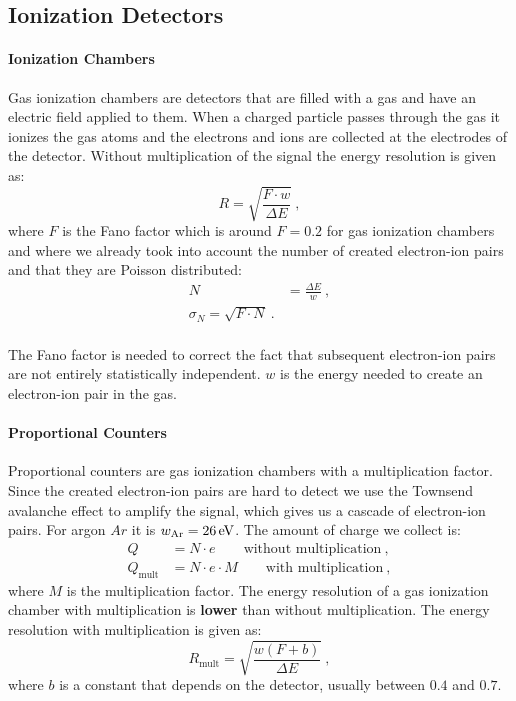 \documentclass[10pt, titlepage, a4paper]{article}
\numberwithin{equation}{section}
\begin{document}
\subsection{Ionization Detectors}
\paragraph{Ionization Chambers}
Gas ionization chambers are detectors that are filled with a gas and have an electric field applied to them. When a charged particle
passes through the gas it ionizes the gas atoms and the electrons and ions are collected at the electrodes of the detector. Without multiplication of the signal 
the energy resolution is given as:
%
\begin{equation}
    R = \sqrt{\frac{F\cdot w}{\Delta E}}\>,
    \label{eq:ionization-res}
\end{equation}
%
where $F$ is the Fano factor which is around $F = 0.2$ for gas ionization chambers and where we already took into account 
the number of created electron-ion pairs and that they are Poisson distributed:
%
\begin{align}
    N &= \frac{\Delta E}{w}\>, \\
    \label{eq:ion-N}
    \sigma_N = \sqrt{F\cdot N}\>. \\
    \label{eq:ion-sigma} 
\end{align}

The Fano factor is needed to correct the fact that subsequent electron-ion pairs are not entirely statistically 
independent. $w$ is the energy needed to create an electron-ion pair in the gas.

\paragraph{Proportional Counters}
Proportional counters are gas ionization chambers with a multiplication factor.
Since the created electron-ion pairs are hard to detect we use the Townsend avalanche effect to amplify 
the signal, which gives us a cascade of electron-ion pairs. 
For argon $Ar$ it is $w_\text{Ar} = 26\,\rm{eV}$. The amount of charge we collect is:
%
\begin{align}
    Q &= N\cdot e \qquad \text{without multiplication}\>, \\
    Q_\text{mult} &= N\cdot e\cdot M \qquad \text{with multiplication}\>,
    \label{eq:ionization-charge}
\end{align}
%
where $M$ is the multiplication factor. The energy resolution of a gas ionization chamber with multiplication 
is \textbf{lower} than without multiplication. The energy resolution with multiplication is given as:
%
\begin{equation}
    R_\text{mult} = \sqrt{\frac{w\left(F+b\right)}{\Delta E}}\>,
    \label{eq:ionization-res-mult}
\end{equation}
%
where $b$ is a constant that depends on the detector, usually between $0.4$ and $0.7$.
\end{document}
